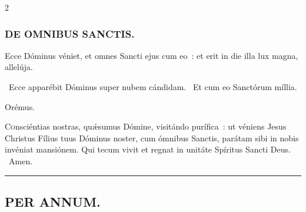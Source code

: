 \documentclass[9pt,twoside]{extarticle}
\begin{document}
\begin{multicols}{2}
{{{\subsubsection*{\center \textsc{DE OMNIBUS SANCTIS.}}
\begin{tightlist}{}
\item {} Ecce Dóminus véniet, et omnes Sancti ejus cum eo~: et erit in die illa lux magna, allelúja.
\item {}~Ecce apparébit Dóminus super nubem cándidam. ~Et cum eo Sanctórum míllia.
\item Orémus. \hfill {}
\end{tightlist}
\lettrine{C}onsciéntias nostras, quǽsumus Dómine, visitándo purífica~: ut véniens Jesus Christus Fílius tuus Dóminus noster, cum ómnibus Sanctis, parátam sibi in nobis invéniat mansiónem. Qui tecum vivit et regnat in unitáte Spíritus Sancti Deus. ~Amen.

\begin{center}\textcolor{red}{\rule{\linewidth}{0.5pt}} \end{center}

\subsection*{\center \textsc{PER ANNUM.}}
}}}
\end{multicols}
\end{document}
